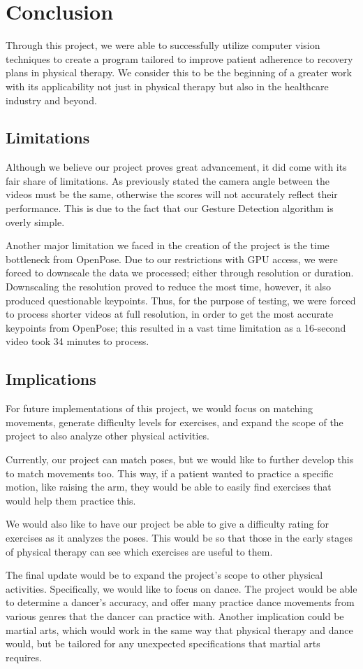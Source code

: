 \section{Conclusion}
\label{sec:conclusion}

\indent Through this project, we were able to successfully utilize computer vision 
techniques to create a program tailored to improve patient adherence to 
recovery plans in physical therapy. We consider this to be the beginning 
of a greater work with its applicability not just in physical therapy 
but also in the healthcare industry and beyond.

\subsection{Limitations}
\indent Although we believe our project proves great advancement, it did 
come with its fair share of limitations. As previously stated the camera 
angle between the videos must be the same, otherwise the scores will not 
accurately reflect their performance. This is due to the fact that our 
Gesture Detection algorithm is overly simple. 

\indent Another major limitation we faced in the creation of the project 
is the time bottleneck from OpenPose. Due to our restrictions with GPU 
access, we were forced to downscale the data we processed; either 
through resolution or duration. Downscaling the resolution proved to 
reduce the most time, however, it also produced questionable keypoints. 
Thus, for the purpose of testing, we were forced to process shorter 
videos at full resolution, in order to get the most accurate keypoints 
from OpenPose; this resulted in a vast time limitation as a 16-second 
video took 34 minutes to process.

\subsection{Implications}
\indent For future implementations of this project, we would focus on 
matching movements, generate difficulty levels for exercises, and expand 
the scope of the project to also analyze other physical activities. 

\indent Currently, our project can match poses, but we would like 
to further develop this to match movements too. This way, if a patient 
wanted to practice a specific motion, like raising the arm, they would 
be able to easily find exercises that would help them practice this. 

\indent We would also like to have our project be able to give a 
difficulty rating for exercises as it analyzes the poses. This would be 
so that those in the early stages of physical therapy can see which 
exercises are useful to them. 

\indent The final update would be to expand the project’s scope to 
other physical activities. Specifically, we would like to focus on 
dance. The project would be able to determine a dancer’s accuracy, and 
offer many practice dance movements from various genres that the 
dancer can practice with. Another implication could be martial arts, 
which would work in the same way that physical therapy and dance would, 
but be tailored for any unexpected specifications that martial arts 
requires. 
